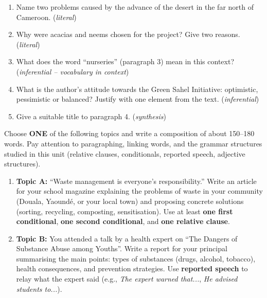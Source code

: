 \documentclass[11pt]{article}
\newcounter{popsec}
\newcounter{popsub}
\newcommand{\courssub}[1]{%
  \stepcounter{popsub}%
  \par\vspace{9pt}\noindent{\popxbold\fontsize{11.5}{13}\selectfont\color{popink}{\color{poporange}\thepopsec.\thepopsub}\hspace{6pt}#1}\par\nopagebreak\vspace{4pt}
}
\begin{document}
\begin{exercice}
\begin{enumerate}
\item Name two problems caused by the advance of the desert in the far north of Cameroon. (\emph{literal})
\item Why were acacias and neems chosen for the project? Give two reasons. (\emph{literal})
\item What does the word ``nurseries'' (paragraph 3) mean in this context? (\emph{inferential -- vocabulary in context})
\item What is the author's attitude towards the Green Sahel Initiative: optimistic, pessimistic or balanced? Justify with one element from the text. (\emph{inferential})
\item Give a suitable title to paragraph 4. (\emph{synthesis})
\end{enumerate}
\end{exercice}

\begin{exercice}
Choose \textbf{ONE} of the following topics and write a composition of about 150--180 words. Pay attention to paragraphing, linking words, and the grammar structures studied in this unit (relative clauses, conditionals, reported speech, adjective structures).

\begin{enumerate}
\item \textbf{Topic A:} ``Waste management is everyone's responsibility.'' Write an article for your school magazine explaining the problems of waste in your community (Douala, Yaoundé, or your local town) and proposing concrete solutions (sorting, recycling, composting, sensitisation). Use at least \textbf{one first conditional}, \textbf{one second conditional}, and \textbf{one relative clause}.
\item \textbf{Topic B:} You attended a talk by a health expert on ``The Dangers of Substance Abuse among Youths''. Write a report for your principal summarising the main points: types of substances (drugs, alcohol, tobacco), health consequences, and prevention strategies. Use \textbf{reported speech} to relay what the expert said (e.g., \emph{The expert warned that...}, \emph{He advised students to...}).
\end{enumerate}
\end{exercice}

\courssub{Corrigés}



\newpage
\end{document}

